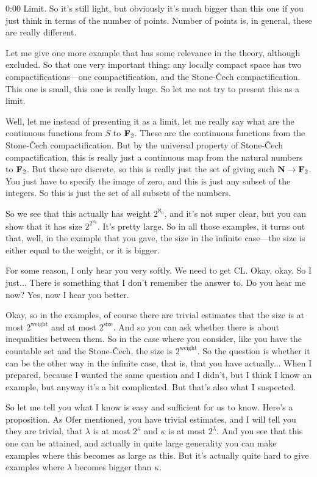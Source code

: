\begin{unfinished}{0:00}
Limit. So it's still light, but obviously it's much bigger than this one if you just think in terms of the number of points. Number of points is, in general, these are really different.

Let me give one more example that has some relevance in the theory, although excluded. So that one very important thing: any locally compact space has two compactifications---one compactification, and the Stone-Čech compactification. This one is small, this one is really huge. So let me not try to present this as a limit.

Well, let me instead of presenting it as a limit, let me really say what are the continuous functions from $S$ to $\mathbf F_2$. These are the continuous functions from the Stone-Čech compactification. But by the universal property of Stone-Čech compactification, this is really just a continuous map from the natural numbers to $\mathbf F_2$. But these are discrete, so this is really just the set of giving such $\mathbf N \to \mathbf F_2$. You just have to specify the image of zero, and this is just any subset of the integers. So this is just the set of all subsets of the numbers.

So we see that this actually has weight $2^{\aleph_0}$, and it's not super clear, but you can show that it has size $2^{2^{\aleph_0}}$. It's pretty large. So in all those examples, it turns out that, well, in the example that you gave, the size in the infinite case---the size is either equal to the weight, or it is bigger.

For some reason, I only hear you very softly. We need to get CL. Okay, okay. So I just... There is something that I don't remember the answer to. Do you hear me now? Yes, now I hear you better.

Okay, so in the examples, of course there are trivial estimates that the size is at most $2^{\text{weight}}$ and at most $2^{\text{size}}$. And so you can ask whether there is about inequalities between them. So in the case where you consider, like you have the countable set and the Stone-Čech, the size is $2^{\text{weight}}$. So the question is whether it can be the other way in the infinite case, that is, that you have actually... When I prepared, because I wanted the same question and I didn't, but I think I know an example, but anyway it's a bit complicated. But that's also what I suspected.

So let me tell you what I know is easy and sufficient for us to know. Here's a proposition. As Ofer mentioned, you have trivial estimates, and I will tell you they are trivial, that $\lambda$ is at most $2^{\kappa}$ and $\kappa$ is at most $2^{\lambda}$. And you see that this one can be attained, and actually in quite large generality you can make examples where this becomes as large as this. But it's actually quite hard to give examples where $\lambda$ becomes bigger than $\kappa$.


\end{unfinished}
